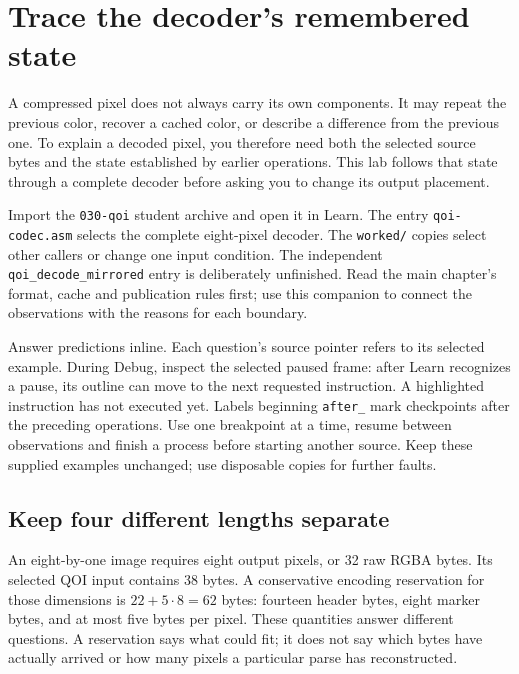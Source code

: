 \chapter{Trace the decoder's remembered state}
\label{revision-lab:qoi}

A compressed pixel does not always carry its own components. It may repeat the
previous color, recover a cached color, or describe a difference from the previous
one. To explain a decoded pixel, you therefore need both the selected source
bytes and the state established by earlier operations. This lab follows that
state through a complete decoder before asking you to change its output placement.

Import the \texttt{030-qoi} student archive and open it in Learn. The entry
\texttt{qoi-codec.asm} selects the complete eight-pixel decoder. The
\texttt{worked/} copies select other callers or change one input condition.
The independent \texttt{qoi\_decode\_mirrored} entry is deliberately unfinished.
Read the main chapter's format, cache and publication rules first; use this
companion to connect the observations with the reasons for each boundary.

Answer predictions inline. Each question's source pointer refers to its selected
example. During Debug, inspect the selected paused frame: after Learn recognizes
a pause, its outline can move to the next requested instruction. A highlighted
instruction has not executed yet. Labels beginning \texttt{after\_} mark
checkpoints after the preceding operations. Use one breakpoint at a time,
resume between observations and finish a process before starting another source.
Keep these supplied examples unchanged; use disposable copies for further faults.

\section{Keep four different lengths separate}

An eight-by-one image requires eight output pixels, or 32 raw RGBA bytes.
Its selected QOI input contains 38 bytes. A conservative encoding reservation
for those dimensions is $22+5\cdot8=62$ bytes: fourteen header bytes, eight
marker bytes, and at most five bytes per pixel. These quantities answer different
questions. A reservation says what could fit; it does not say which bytes have
actually arrived or how many pixels a particular parse has reconstructed.

